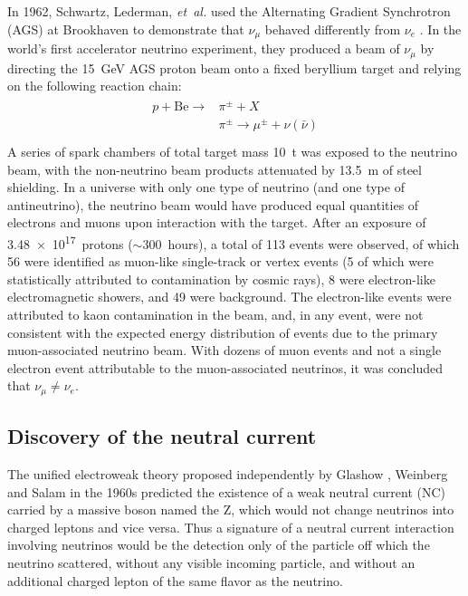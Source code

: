 In 1962, Schwartz, Lederman, \emph{et~al.} used the
Alternating Gradient Synchrotron (AGS) at Brookhaven
to demonstrate that $\nu_\mu$ behaved differently from $\nu_e$
\cite{numu_vs_nue}.
In the world's first accelerator neutrino experiment,
they produced a beam of $\nu_\mu$ by directing
the \SI{15}{\GeV} AGS proton beam
onto a fixed beryllium target and relying on the following reaction chain:
\begin{align}\label{eq:accel_reaction_chain}
    \begin{split}
        p + \text{Be} \to &\pi^{\pm} + X \\
        &\pi^{\pm} \to \mu^{\pm} + \nu(\bar{\nu}) \\
    \end{split}
\end{align}
A series of spark chambers of total target mass \SI{10}{\tonne}
was exposed to the neutrino beam,
with the non-neutrino beam products attenuated
by \SI{13.5}{\m} of steel shielding.
In a universe with only one type of neutrino (and one type of antineutrino),
the neutrino beam would have produced equal quantities
of electrons and muons upon interaction with the target.
After an exposure of \num{3.48e17}~protons ($\sim300$~hours),
a total of 113 events were observed,
of which 56 were identified as muon-like single-track or vertex events
(5 of which were statistically attributed to contamination by cosmic rays),
8 were electron-like electromagnetic showers, and 49 were background.
The electron-like events were attributed to
kaon contamination in the beam,
and, in any event, were not consistent with the
expected energy distribution of events due to the
primary muon-associated neutrino beam.
With dozens of muon events and not a single electron event
attributable to the muon-associated neutrinos,
it was concluded that $\nu_\mu \neq \nu_e$.


\subsection{Discovery of the neutral current}
\label{subsec:neutral_current}

The unified electroweak theory proposed independently by
Glashow \cite{glashow}, Weinberg \cite{weinberg} and Salam \cite{salam}
in the 1960s
predicted the existence of a weak neutral current (NC)
carried by a massive boson named the Z,
which would not change neutrinos into charged leptons and vice versa.
Thus a signature of a neutral current interaction involving neutrinos
would be the detection only of the particle off which the neutrino scattered,
without any visible incoming particle,
and without an additional charged lepton of the same flavor as the neutrino.

